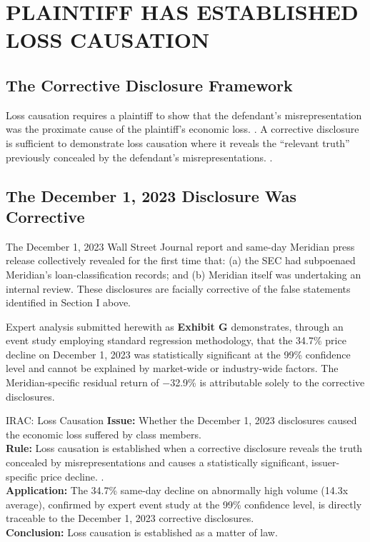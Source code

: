 \section{PLAINTIFF HAS ESTABLISHED LOSS CAUSATION}

\subsection{The Corrective Disclosure Framework}

Loss causation requires a plaintiff to show that the defendant's misrepresentation was the proximate cause of the plaintiff's economic loss. . A corrective disclosure is sufficient to demonstrate loss causation where it reveals the ``relevant truth'' previously concealed by the defendant's misrepresentations. .

\subsection{The December 1, 2023 Disclosure Was Corrective}

The December 1, 2023 Wall Street Journal report and same-day Meridian press release collectively revealed for the first time that: (a) the SEC had subpoenaed Meridian's loan-classification records; and (b) Meridian itself was undertaking an internal review. These disclosures are facially corrective of the false statements identified in Section I above.

Expert analysis submitted herewith as \textbf{Exhibit G} demonstrates, through an event study employing standard regression methodology, that the 34.7\% price decline on December 1, 2023 was statistically significant at the 99\% confidence level and cannot be explained by market-wide or industry-wide factors. The Meridian-specific residual return of $-$32.9\% is attributable solely to the corrective disclosures.

\begin{iracblock}{IRAC: Loss Causation}
\textbf{Issue:} Whether the December 1, 2023 disclosures caused the economic loss suffered by class members.\\[4pt]
\textbf{Rule:} Loss causation is established when a corrective disclosure reveals the truth concealed by misrepresentations and causes a statistically significant, issuer-specific price decline. .\\[4pt]
\textbf{Application:} The 34.7\% same-day decline on abnormally high volume (14.3x average), confirmed by expert event study at the 99\% confidence level, is directly traceable to the December 1, 2023 corrective disclosures.\\[4pt]
\textbf{Conclusion:} Loss causation is established as a matter of law.
\end{iracblock}
